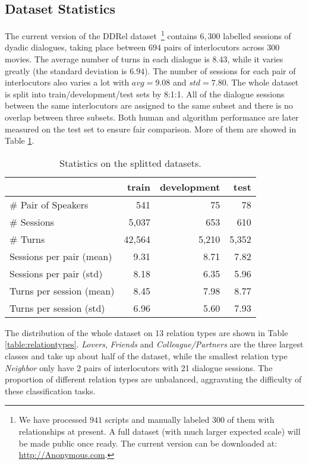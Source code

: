 \subsection{Dataset Statistics}
The current version of the DDRel dataset~\footnote{We have processed $941$ scripts and 
	manually labeled $300$ of them with relationships at present.
	A full dataset (with much larger expected scale) will be made 
	public once ready. The current version can be downloaded at: 
	\url{http://Anonymous.com}.}
contains $6,300$ labelled sessions of dyadic dialogues, taking place between $694$ pairs of interlocutors across $300$ movies. 
The average number of turns in each dialogue is $8.43$, 
while it varies greatly (the standard deviation is $6.94$).  The number of sessions for each pair of interlocutors also varies a lot with $avg=9.08$ and $std=7.80$. The whole dataset is split into train/development/test sets by 8:1:1. All of the dialogue sessions between the same interlocutors are assigned to the same subset and there is no overlap between three subsets. Both human and algorithm performance are later measured on the test set to ensure fair comparison. More  of them are showed in Table \ref{table:dataset}.
\begin{table}[h!]
	\centering
	\small
	\begin{tabular}{@{}lrrr@{}}
		\toprule[1.5pt]
		\textbf{}                				& \textbf{train} & \textbf{development} & \textbf{test} \\ 
		\hline
		\# Pair of Speakers      		  &   541     &  75     &   78  \\
		\# Sessions             			 &     5,037   &    653    &  610  \\
		\# Turns                			   &   42,564     &    5,210    &  5,352  \\
		Sessions per pair (mean)  	  &    9.31    &   8.71     &  7.82  \\
		Sessions per pair (std)        &    8.18    &   6.35     & 5.96   \\
		Turns per session (mean)    &    8.45     &   7.98     &   8.77 \\
		Turns per session (std)      &    6.96     &   5.60     &  7.93  \\
		\bottomrule[1.5pt]
		
	\end{tabular}
	\caption{Statistics on the splitted datasets.}\label{table:dataset}
\end{table}

The distribution of the whole dataset on 13 relation types are shown in Table \ref{table:relationtypes}. {\em Lovers}, {\em Friends} and {\em Colleague/Partners} are the three largest classes and take up about half of the dataset, while the smallest relation type {\em Neighbor} only have 2 pairs of interlocutors with 21 dialogue sessions. The proportion of different relation types are unbalanced, aggravating the difficulty of these classification tasks.





